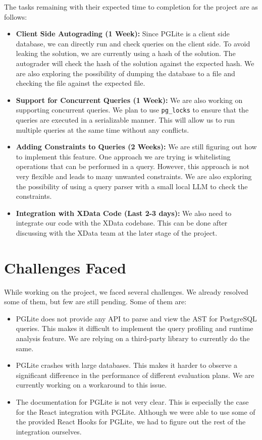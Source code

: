 \documentclass{article}
\begin{document}
The tasks remaining with their expected time to completion for the project are as follows:
\begin{itemize}
    \item \textbf{Client Side Autograding (1 Week):} Since PGLite is a client side database, we can directly run and check queries on the client side. To avoid leaking the solution, we are currently using a hash of the solution. The autograder will check the hash of the solution against the expected hash. We are also exploring the possibility of dumping the database to a file and checking the file against the expected file.
    \item \textbf{Support for Concurrent Queries (1 Week):} We are also working on supporting concurrent queries. We plan to use \verb|pg_locks| to ensure that the queries are executed in a serializable manner. This will allow us to run multiple queries at the same time without any conflicts.
    \item \textbf{Adding Constraints to Queries (2 Weeks):} We are still figuring out how to implement this feature. One approach we are trying is whitelisting operations that can be performed in a query. However, this approach is not very flexible and leads to many unwanted constraints. We are also exploring the possibility of using a query parser with a small local LLM to check the constraints.
    \item \textbf{Integration with XData Code (Last 2-3 days):} We also need to integrate our code with the XData codebase. This can be done after discussing with the XData team at the later stage of the project.
\end{itemize}


\section{Challenges Faced}
While working on the project, we faced several challenges. We already resolved some of them, but few are still pending. Some of them are:
\begin{itemize}
    \item PGLite does not provide any API to parse and view the AST for PostgreSQL queries. This makes it difficult to implement the query profiling and runtime analysis feature. We are relying on a third-party library to currently do the same.
    \item PGLite crashes with large databases. This makes it harder to observe a significant difference in the performance of different evaluation plans. We are currently working on a workaround to this issue.
    \item The documentation for PGLite is not very clear. This is especially the case for the React integration with PGLite. Although we were able to use some of the provided React Hooks for PGLite, we had to figure out the rest of the integration ourselves. 
\end{itemize}
\end{document}
